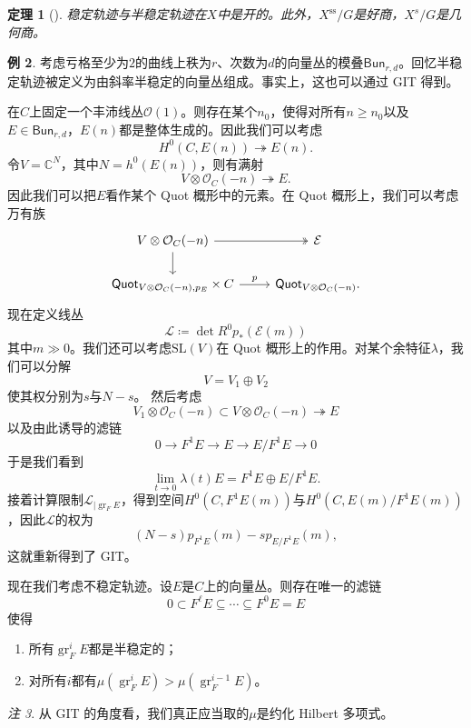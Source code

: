 \documentclass{amsart}
\newtheorem{thm}{定理}[section]
\theoremstyle{definition}
\newtheorem{exm}[thm]{例}
\theoremstyle{remark}
\newtheorem{rmk}[thm]{注}
\theoremstyle{plain}
\theoremstyle{definition}
\theoremstyle{remark}
\newcommand{\C}{\mathbb{C}}
\newcommand{\mc}[1]{\mathcal{#1}}
\newcommand{\mr}[1]{\mathrm{#1}}
\newcommand{\on}[1]{\operatorname{#1}}
\newcommand{\ms}[1]{\mathsf{#1}}
\newcommand{\1}{\mathbf{1}}
\newcommand{\2}{\mathbf{2}}
\newcommand{\3}{\mathbf{3}}
\begin{document}
\begin{thm}[{\cite{MFK1994}}]
    稳定轨迹与半稳定轨迹在\(X\)中是开的。此外，\(X^{\on{ss}}/G\)是好商，\(X^s/G\)是几何商。
\end{thm}

\begin{exm}
    考虑亏格至少为\(2\)的曲线上秩为\(r\)、次数为\(d\)的向量丛的模叠\(\ms{Bun}_{r,d}\)。回忆半稳定轨迹被定义为由斜率半稳定的向量丛组成。事实上，这也可以通过 GIT 得到。

    在\(C\)上固定一个丰沛线丛\(\mc{O}(1)\)。则存在某个\(n_0\)，使得对所有\(n \geq n_0\)以及\(E \in \ms{Bun}_{r,d}\)，\(E(n)\)都是整体生成的。因此我们可以考虑
    \[ H^0(C, E(n)) \twoheadrightarrow E(n). \]
    令\(V = \C^N\)，其中\(N = h^0(E(n))\)，则有满射
    \[ V \otimes \mc{O}_C(-n) \twoheadrightarrow E. \]
    因此我们可以把\(E\)看作某个 Quot 概形中的元素。在 Quot 概形上，我们可以考虑万有族
    \begin{equation*}
    \begin{tikzcd}
        V \otimes \mc{O}_C(-n) \ar[twoheadrightarrow]{r} \ar{d} & \mc{E} \\
        \ms{Quot}_{V \otimes \mc{O}_C(-n), p_E} \times C \ar{r}{p} & \ms{Quot}_{V \otimes \mc{O}_C(-n)}.
    \end{tikzcd}
    \end{equation*}
    现在定义线丛
    \[ \mc{L} \coloneqq \det R^0 p_* (\mc{E}(m)) \]
    其中\(m \gg 0\)。我们还可以考虑\(\mr{SL}(V)\)在 Quot 概形上的作用。对某个余特征\(\lambda\)，我们可以分解
    \[ V = V_1 \oplus V_2 \]
    使其权分别为\(s\)与\(N-s\)。
    然后考虑
    \[ V_1 \otimes \mc{O}_C(-n) \subset V \otimes \mc{O}_C(-n) \twoheadrightarrow E \]
    以及由此诱导的滤链
    \[ 0 \to F^1 E \to E \to E / F^1 E \to 0 \]
    于是我们看到
    \[ \lim_{t \to 0} \lambda(t) E = F^1 E \oplus E/F^1 E. \]
    接着计算限制\(\mc{L}_{|\on{gr}_F E}\)，得到空间\(H^0(C, F^1 E(m))\)与\(H^0(C, E(m)/F^1 E(m))\)，因此\(\mc{L}\)的权为
    \[ (N-s) p_{F^1 E}(m) - s p_{E/F^1 E}(m), \]
    这就重新得到了 GIT。
\end{exm}

现在我们考虑不稳定轨迹。设\(E\)是\(C\)上的向量丛。则存在唯一的滤链
\[ 0 \subset F^{\ell} E \subseteq \cdots \subseteq F^0 E = E \]
使得
\begin{enumerate}
    \item 所有\(\on{gr}_F^i E\)都是半稳定的；
    \item 对所有\(i\)都有\(\mu(\on{gr}_F^i E) > \mu(\on{gr}_F^{i-1} E)\)。
\end{enumerate}
\begin{rmk}
    从 GIT 的角度看，我们真正应当取的\(\mu\)是约化 Hilbert 多项式。
\end{rmk}
\end{document}
